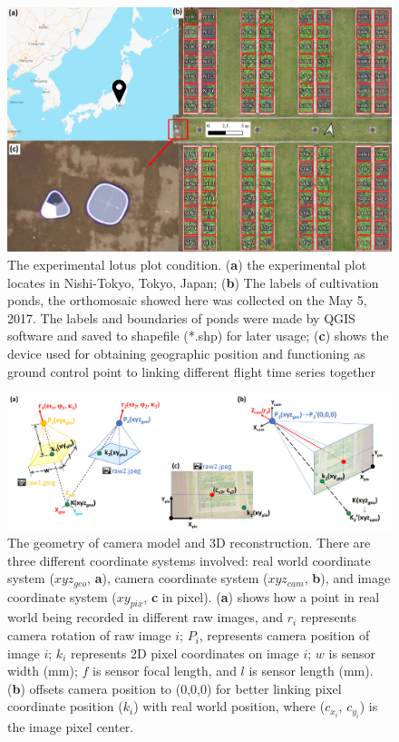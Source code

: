 \documentclass[doublespacing]{configs/bmcart}
\begin{document}
\begin{backmatter}
\begin{figure}[!htb]
  \includegraphics[width=0.95\linewidth]{figures/map.pdf}
  \caption{The experimental lotus plot condition. (\textbf{a}) the experimental plot locates in Nishi-Tokyo, Tokyo, Japan; (\textbf{b}) The labels of cultivation ponds, the orthomosaic showed here was collected on the May 5, 2017. The labels and boundaries of ponds were made by QGIS software and saved to shapefile (*.shp) for later usage; (\textbf{c}) shows the device used for obtaining geographic position and functioning as ground control point to linking different flight time series together}
  \label{fig:map}
\end{figure}

\begin{figure}[!htb]
  \includegraphics[width=0.95\linewidth]{figures/raw2raw.pdf}
  \caption{The geometry of camera model and 3D reconstruction. There are three different coordinate systems involved: real world coordinate system ($xyz_{geo}$, \textbf{a}), camera coordinate system ($xyz_{cam}$, \textbf{b}), and image coordinate system ($xy_{pix}$, \textbf{c} in pixel). (\textbf{a}) shows how a point in real world being recorded in different raw images, and $r_i$ represents camera rotation of raw image $i$; $P_i$, represents camera position of image $i$; $k_i$ represents 2D pixel coordinates on image $i$; $w$ is sensor width (mm); $f$ is sensor focal length, and $l$ is sensor length (mm). (\textbf{b}) offsets camera position to (0,0,0) for better linking pixel coordinate position ($k_i$) with real world position, where ($c_{x_i}$, $c_{y_i}$) is the image pixel center.}
  \label{fig:geom}
\end{figure}


\end{backmatter}
\end{document}
